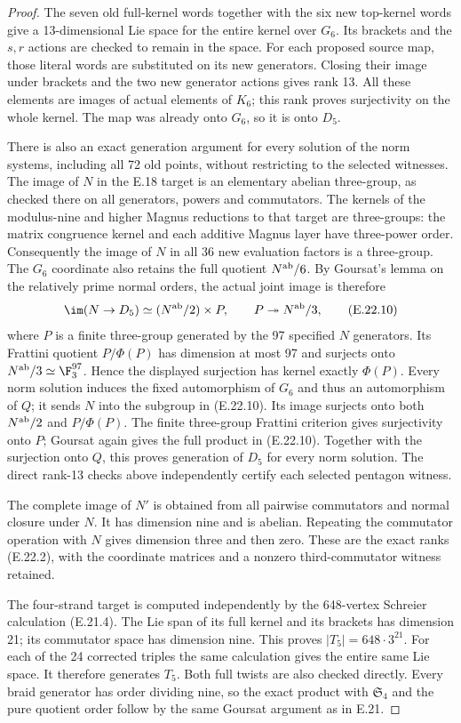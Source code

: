 \begin{proof}
The seven old full-kernel
words together with the
six new top-kernel words
give a 13-dimensional
Lie space for the entire
kernel over $G_6$.
Its brackets and the
$s,r$ actions are checked
to remain in the space.
For each proposed source
map, those literal words
are substituted on its
new generators. Closing
their image under brackets
and the two new generator
actions gives rank 13.
All these elements are
images of actual elements
of $K_6$; this rank proves
surjectivity on the whole
kernel. The map was
already onto $G_6$, so
it is onto $D_5$.

There is also an exact generation argument
for every solution of the norm systems,
including all 72 old points, without
restricting to the selected witnesses.
The image of $N$ in the E.18 target is
an elementary abelian three-group,
as checked there on all generators,
powers and commutators. The kernels
of the modulus-nine and higher Magnus
reductions to that target are
three-groups: the matrix congruence
kernel and each additive Magnus
layer have three-power order.
Consequently the image of $N$ in
all 36 new evaluation factors is
a three-group. The $G_6$ coordinate
also retains the full quotient
$N^{\rm ab}/6$. By Goursat's lemma
on the relatively prime normal
orders, the actual joint image is
therefore
\[
 \im(N\to D_5)\simeq
       (N^{\rm ab}/2)\times P,
 \qquad P\twoheadrightarrow N^{\rm ab}/3,
 \tag{E.22.10}
\]
where $P$ is a finite three-group
generated by the 97 specified
$N$ generators. Its Frattini
quotient $P/\Phi(P)$ has dimension
at most 97 and surjects onto
$N^{\rm ab}/3\simeq\F_3^{97}$.
Hence the displayed surjection
has kernel exactly $\Phi(P)$.
Every norm solution induces the
fixed automorphism of $G_6$ and
thus an automorphism of $Q$;
it sends $N$ into the subgroup
in (E.22.10). Its image surjects
onto both $N^{\rm ab}/2$ and
$P/\Phi(P)$. The finite
three-group Frattini criterion
gives surjectivity onto $P$;
Goursat again gives the full
product in (E.22.10). Together
with the surjection onto $Q$,
this proves generation of
$D_5$ for every norm solution.
The direct rank-13 checks
above independently certify
each selected pentagon witness.

The complete image of
$N'$ is obtained from
all pairwise commutators
and normal closure under
$N$. It has dimension
nine and is abelian.
Repeating the commutator
operation with $N$ gives
dimension three and then
zero. These are the exact
ranks (E.22.2), with the
coordinate matrices and
a nonzero third-commutator
witness retained.

The four-strand target is
computed independently by
the 648-vertex Schreier
calculation (E.21.4).
The Lie span of its full
kernel and its brackets
has dimension 21; its
commutator space has
dimension nine. This
proves $|T_5|=648\cdot3^{21}$.
For each of the 24
corrected triples the
same calculation gives
the entire same Lie
space. It therefore
generates $T_5$. Both
full twists are also
checked directly. Every
braid generator has
order dividing nine, so
the exact product with
$\mathfrak S_4$ and the
pure quotient order
follow by the same
Goursat argument as in
E.21.


\end{proof}
